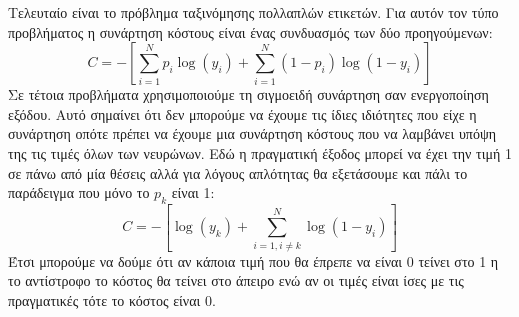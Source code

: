 Τελευταίο είναι το πρόβλημα ταξινόμησης πολλαπλών ετικετών. Για αυτόν τον τύπο προβλήματος η συνάρτηση κόστους είναι ένας συνδυασμός των δύο προηγούμενων:
$$C=-\left[\sum\limits_{i=1}^Np_i\log (y_i) +\sum\limits_{i=1}^N(1-p_i)\log (1-y_i)\right]$$
Σε τέτοια προβλήματα χρησιμοποιούμε τη σιγμοειδή συνάρτηση σαν ενεργοποίηση εξόδου. Αυτό σημαίνει ότι δεν μπορούμε να έχουμε τις ίδιες ιδιότητες που είχε η συνάρτηση  οπότε πρέπει να έχουμε μια συνάρτηση κόστους που να λαμβάνει
υπόψη της τις τιμές όλων των νευρώνων. Εδώ η πραγματική έξοδος μπορεί να έχει την τιμή 1 σε πάνω από μία θέσεις αλλά για λόγους απλότητας θα εξετάσουμε και πάλι το παράδειγμα που μόνο το $p_k$ είναι 1:
$$C=-\left[\log (y_k) +\sum\limits_{i=1,i\neq k}^N\log (1-y_i)\right]$$
Έτσι μπορούμε να δούμε ότι αν κάποια τιμή που θα έπρεπε να είναι 0 τείνει στο 1 η το αντίστροφο το κόστος θα τείνει στο άπειρο ενώ αν οι τιμές είναι ίσες με τις πραγματικές τότε το κόστος είναι 0.